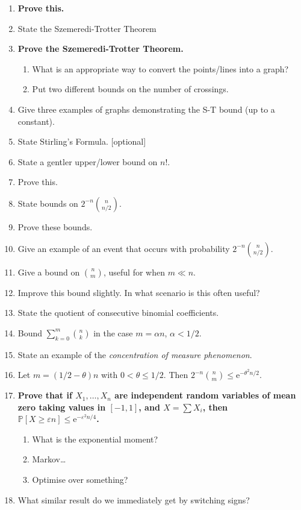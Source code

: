 \documentclass{article}
\renewcommand{\rm}[1]{\mathrm{#1}}
\newcommand{\e}{\rm{e}}
\newcommand{\eps}{\varepsilon}
\renewcommand{\P}{\mathbb{P}}
\begin{document}
\begin{enumerate}
    \item \textbf{Prove this.}
    \item State the Szemeredi-Trotter Theorem
    \item \textbf{Prove the Szemeredi-Trotter Theorem.}
    \begin{enumerate}
        \item What is an appropriate way to convert the points/lines into a graph?
        \item Put two different bounds on the number of crossings.
    \end{enumerate}
    \item Give three examples of graphs demonstrating the S-T bound (up to a constant).
    \item State Stirling's Formula. [optional]
    \item State a gentler upper/lower bound on $n!$.
    \item Prove this.
    \item State bounds on $2^{-n}{n\choose n/2}$.
    \item Prove these bounds.
    \item Give an example of an event that occurs with probability $2^{-n}{n\choose n/2}$.
    \item Give a bound on ${n\choose m}$, useful for when $m \ll  n$.
    \item Improve this bound slightly. In what scenario is this often useful?
    \item State the quotient of consecutive binomial coefficients.
    \item Bound $\sum_{k=0}^{m}{n\choose k}$ in the case $m =\alpha n$, $\alpha < 1/2$.
    \item State an example of the \textit{concentration of measure phenomenon}.
    \item Let $m = (1/2 - \theta)n$ with $0 < \theta \le 1/2$. Then $2^{-n}{n\choose m}\le \e^{-\theta^2n/2}$.
    \item \textbf{Prove that if $X_1,\dots,X_n$ are independent random variables of mean zero taking values in $[-1,1]$, and $X = \sum X_i$, then $\P[X\ge \eps n] \le \e^{-\eps^2n/4}$.}
    \begin{enumerate}
        \item What is the exponential moment?
        \item Markov\dots
        \item Optimise over something?
    \end{enumerate}
    \item What similar result do we immediately get by switching signs?

\end{enumerate}
\end{document}
